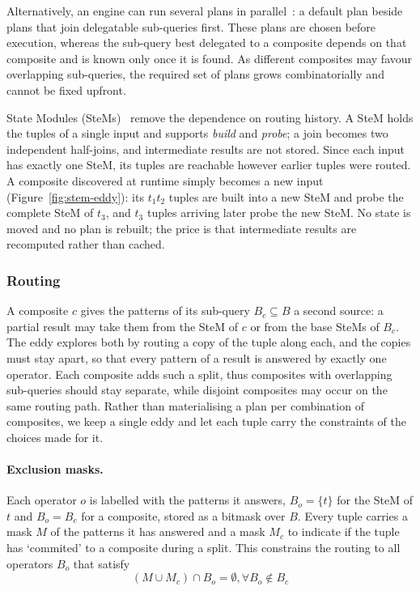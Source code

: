 Alternatively, an engine can run several plans in
parallel~\cite{tzoumas2010sharing,wei2024rome,justen2024polar}: a default plan beside
plans that join delegatable sub-queries first. These plans are chosen before execution,
whereas the sub-query best delegated to a composite depends on that composite and is known
only once it is found. As different composites may favour overlapping sub-queries, the
required set of plans grows combinatorially and cannot be fixed upfront.

State Modules (SteMs)~\cite{raman2003using} remove the dependence on routing history. A
SteM holds the tuples of a single input and supports \emph{build} and \emph{probe}; a join
becomes two independent half-joins, and intermediate results are not stored. Since each
input has exactly one SteM, its tuples are reachable however earlier tuples were routed.
A composite discovered at runtime simply becomes a new input
(Figure~\ref{fig:stem-eddy}): its $t_1 t_2$ tuples are built into a new SteM and probe the
complete SteM of $t_3$, and $t_3$ tuples arriving later probe the new SteM. No state is
moved and no plan is rebuilt; the price is that intermediate results are recomputed rather
than cached.

\subsubsection{Routing}
\label{sec:routing}

A composite $c$ gives the patterns of its sub-query $B_c \subseteq B$ a second source: a
partial result may take them from the SteM of $c$ or from the base SteMs of $B_c$. The
eddy explores both by routing a copy of the tuple along each, and the copies must stay
apart, so that every pattern of a result is answered by exactly one operator. Each
composite adds such a split, thus composites with overlapping sub-queries should stay separate,
while disjoint composites may occur on the same routing path.
Rather than materialising a plan per combination of composites, we keep a
single eddy and let each tuple carry the constraints of the choices made for it.

\paragraph{Exclusion masks.}
Each operator $o$ is labelled with the patterns it answers, $B_o = \{t\}$ for the SteM of
$t$ and $B_o = B_c$ for a composite, stored as a bitmask over $B$. Every tuple carries a
mask $M$ of the patterns it has answered and a mask $M_{c}$ to indicate if the tuple has
`commited' to a composite during a split.
This constrains the routing to all operators $B_{o}$ that satisfy
\[
    (M \cup M_c) \cap B_o = \emptyset, \forall B_{o} \notin B_{c}
\]


